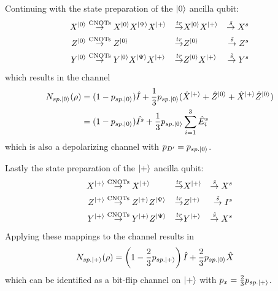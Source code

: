 Continuing with the state preparation of the $\ket{0}$ ancilla qubit:
\begin{align*}
    X^{\ket{0}}  
    &\overset{\text{CNOTs}}{\rightarrow} X^{\ket{0}} X^{\ket{\Psi}} X^{\ket{+}}
    &\overset{tr}{\rightarrow} &X^{\ket{0}} X^{\ket{+}}
    &\overset{\tilde{s}}{\rightarrow} X^s  \\
    Z^{\ket{0}}  
    &\overset{\text{CNOTs}}{\rightarrow} Z^{\ket{0}} 
    &\overset{tr}{\rightarrow} & Z^{\ket{0}}   
    &\overset{\tilde{s}}{\rightarrow} Z^s  \\
    Y^{\ket{0}}  
    &\overset{\text{CNOTs}}{\rightarrow} Y^{\ket{0}} X^{\ket{\Psi}} X^{\ket{+}}
    &\overset{tr}{\rightarrow} & Z^{\ket{0}} X^{\ket{+}} 
    &\overset{\tilde{s}}{\rightarrow} Y^s  \\
\end{align*} 
which results in the channel
\begin{align*}
    N_{sp.\ket{0}} (\rho) &= (1-p_{sp.\ket{0}}) \hat{I} + \frac{1}{3}p_{sp.\ket{0}}(\hat{X}^{\ket{+}} + \hat{Z}^{\ket{0}} + \hat{X}^{\ket{+}} \hat{Z}^{\ket{0}})\\
        &=  (1-p_{sp.\ket{0}}) \hat{I^s} + \frac{1}{3} p_{sp.\ket{0}}\sum_{i=1}^3 \hat{E}_{i}^s\\
\end{align*}
which is also a depolarizing channel with $p_{D'} = p_{sp.\ket{0}}$.

Lastly the state preparation of the $\ket{+}$ ancilla qubit:
\begin{align*}
    X^{\ket{+}}  
    &\overset{\text{CNOTs}}{\rightarrow} X^{\ket{+}} 
    &\overset{tr}{\rightarrow} & X^{\ket{+}} 
    &\overset{\tilde{s}}{\rightarrow} X^s  \\
    Z^{\ket{+}}  
    &\overset{\text{CNOTs}}{\rightarrow} Z^{\ket{+}} Z^{\ket{\Psi}} 
    &\overset{tr}{\rightarrow} & Z^{\ket{+}}   
    &\overset{\tilde{s}}{\rightarrow} I^s  \\
    Y^{\ket{+}}  
    &\overset{\text{CNOTs}}{\rightarrow} Y^{\ket{+}} Z^{\ket{\Psi}} 
    &\overset{tr}{\rightarrow} & Y^{\ket{+}} 
    &\overset{\tilde{s}}{\rightarrow} X^s  \\
\end{align*} 
Applying these mappings to the channel results in 
\begin{align*}
    N_{sp.\ket{+}} (\rho) &= \left(1-\frac{2}{3}p_{sp.\ket{+}}\right) \hat{I} + \frac{2}{3}p_{sp.\ket{0}} \hat{X}^{}
\end{align*}
which can be identified as a bit-flip channel on $\ket{+}$ with $p_x=\frac{2}{3} p_{sp.\ket{+}}$.

